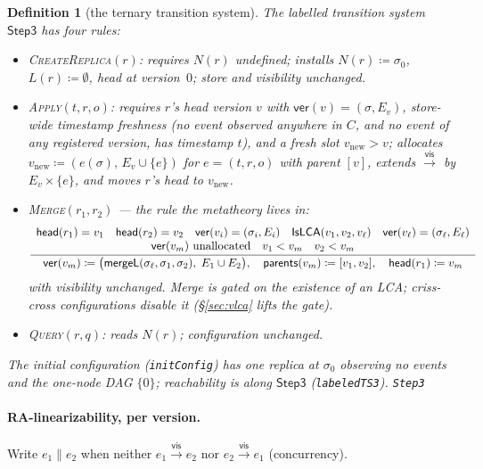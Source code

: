 \documentclass[11pt]{article}
\newtheorem{definition}[theorem]{Definition}
\newcommand{\vis}{\xrightarrow{\mathsf{vis}}}
\newcommand{\mergeL}{\mathsf{mergeL}}
\newcommand{\Sinit}{\sigma_0}
\newcommand{\lean}[1]{\texttt{#1}}
\begin{document}
\begin{definition}[the ternary transition system]
\label{def:step3}
The labelled transition system $\mathsf{Step3}$ has four rules:
\begin{itemize}[leftmargin=2em]
\item \textsc{CreateReplica}$(r)$: requires $N(r)$ undefined; installs
  $N(r) \coloneqq \Sinit$, $L(r) \coloneqq \emptyset$, head at
  version~$0$; store and visibility unchanged.
\item \textsc{Apply}$(t,r,o)$: requires $r$'s head version $v$ with
  $\mathsf{ver}(v) = (\sigma, E_v)$, \emph{store-wide} timestamp
  freshness (no event observed anywhere in $C$, and no event of any
  registered version, has timestamp $t$), and a fresh slot
  $v_{\mathrm{new}} > v$; allocates $v_{\mathrm{new}} \coloneqq
  (e(\sigma),\, E_v \cup \{e\})$ for $e = (t,r,o)$ with parent $[v]$,
  extends $\vis$ by $E_v \times \{e\}$, and moves $r$'s head to
  $v_{\mathrm{new}}$.
\item \textsc{Merge}$(r_1,r_2)$ --- the rule the metatheory lives in:
  \[
  \frac{\begin{array}{c}
    \mathsf{head}(r_1) = v_1 \quad \mathsf{head}(r_2) = v_2 \quad
    \mathsf{ver}(v_i) = (\sigma_i, E_i) \quad
    \mathsf{IsLCA}(v_1, v_2, v_\ell) \quad
    \mathsf{ver}(v_\ell) = (\sigma_\ell, E_\ell) \\
    \mathsf{ver}(v_m)\ \text{unallocated} \quad v_1 < v_m \quad v_2 < v_m
  \end{array}}{%
    \mathsf{ver}(v_m) \coloneqq
    \bigl(\mergeL(\sigma_\ell, \sigma_1, \sigma_2),\; E_1 \cup E_2\bigr),
    \quad \mathsf{parents}(v_m) \coloneqq [v_1, v_2],
    \quad \mathsf{head}(r_1) \coloneqq v_m}
  \]
  with visibility unchanged. Merge is \emph{gated} on the existence of
  an LCA; criss-cross configurations disable it (\S\ref{sec:vlca} lifts
  the gate).
\item \textsc{Query}$(r,q)$: reads $N(r)$; configuration unchanged.
\end{itemize}
The initial configuration (\lean{initConfig}) has one replica at
$\Sinit$ observing no events and the one-node DAG $\{0\}$; reachability
is along $\mathsf{Step3}$ (\lean{labeledTS3}).
\hfill\lean{Step3}
\end{definition}

\paragraph{RA-linearizability, per version.} Write $e_1 \parallel e_2$
when neither $e_1 \vis e_2$ nor $e_2 \vis e_1$ (concurrency).
\end{document}
